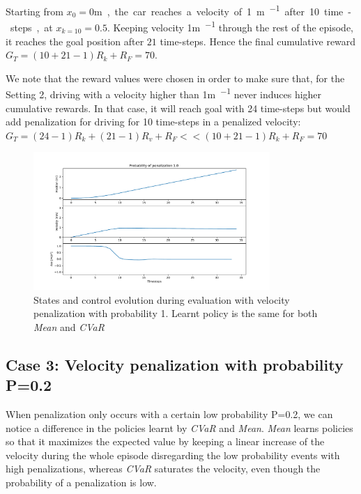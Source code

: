 Starting from $x_0=0$\si\metre, the car reaches a velocity of 1\si{\metre\per\ts} after 
10 time-steps, at $x_{k=10}=0.5$. Keeping velocity 1\si{\metre\per\ts} through 
the rest of the episode, it reaches the goal position after $21$ time-steps. 
Hence the final cumulative reward $G_T= (10+21-1) R_{k} + R_{F}=70$.

We note that the reward values were chosen in order to make sure that, for the Setting 2,
driving with a velocity higher than 1\si{\metre\per\ts} never induces higher cumulative
rewards. In that case, it will reach goal with 24 time-steps
but would add penalization for driving for 10 time-steps in a penalized velocity:\\
$G_T= (24-1)R_{k} + (21-1)R_{v} + R_{F} << (10+21-1) R_{k} + R_{F}=70$

\begin{figure}[ht]
        \centering
        \includegraphics[width=0.8\textwidth]{images/Car/CVAR/Trajectory_penal.pdf}
        \caption{States and control evolution during evaluation with velocity penalization
        with probability 1.
        Learnt policy is the same for both \textit{Mean} and \textit{CVaR}}
        \label{fig:traj1_penal1}
    
\end{figure}

\newpage
\subsection{Case 3: Velocity penalization with probability P=0.2 }
When penalization only occurs with a certain low probability P=0.2, we can notice a difference
in the policies learnt by \textit{CVaR} and \textit{Mean}.
\textit{Mean} learns policies so that it maximizes the expected
value by keeping a linear increase of the velocity during the whole episode disregarding the low probability events with high penalizations,
whereas \textit{CVaR} saturates the velocity, even though the
probability of a penalization is low.

